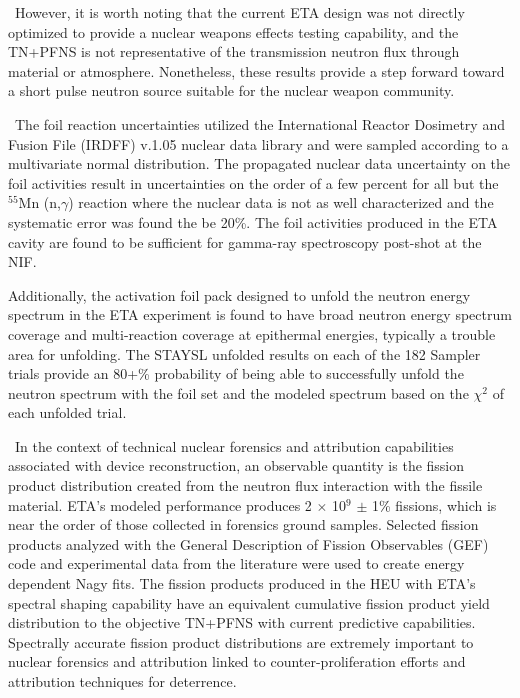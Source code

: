\ However, it is worth noting that the current ETA design was not directly optimized to provide a nuclear weapons effects testing capability, and the TN+PFNS is not representative of the transmission neutron flux through material or atmosphere.
Nonetheless, these results provide a step forward toward a short pulse neutron source suitable for the nuclear weapon community. 

\ The foil reaction uncertainties utilized the International Reactor Dosimetry and Fusion File (IRDFF) v.1.05 nuclear data library and were sampled according to a multivariate normal distribution.   
The propagated nuclear data uncertainty on the foil activities result in uncertainties on the order of a few percent for all but the $\mathrm{^{55}}$Mn (n,$\gamma$) reaction where the nuclear data is not as well characterized and the systematic error was found the be 20\%.
The foil activities produced in the ETA cavity are found to be sufficient for gamma-ray spectroscopy post-shot at the NIF.  

Additionally, the activation foil pack designed to unfold the neutron energy spectrum in the ETA experiment is found to have broad neutron energy spectrum coverage and multi-reaction coverage at epithermal energies, typically a trouble area for unfolding. 
The STAYSL unfolded results on each of the 182 Sampler trials provide an 80+\% probability of being able to successfully unfold the neutron spectrum with the foil set and the modeled spectrum based on the $\chi^2$ of each unfolded trial. 

\ In the context of technical nuclear forensics and attribution capabilities associated with device reconstruction, an observable quantity is the fission product distribution created from the neutron flux interaction with the fissile material. 
ETA's modeled performance produces 2 $\times$ 10$^{9}$ $\pm$ 1\% fissions, which is near the order of those collected in forensics ground samples. 
Selected fission products analyzed with the General Description of Fission Observables (GEF) code and experimental data from the literature were used to create energy dependent Nagy fits. 
The fission products produced in the HEU with ETA's spectral shaping capability have an equivalent cumulative fission product yield distribution to the objective TN+PFNS with current predictive capabilities.  
Spectrally accurate fission product distributions are extremely important to nuclear forensics and attribution linked to counter-proliferation efforts and attribution techniques for deterrence. 

